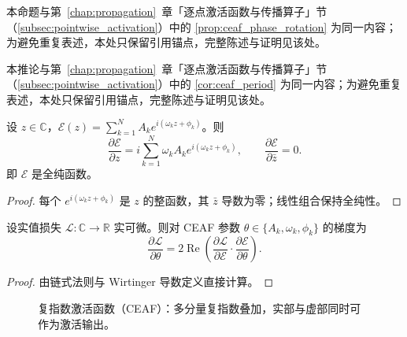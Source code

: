 \begin{proposition}\label{prop:ceaf_propagation_anchor}
本命题与第~\ref{chap:propagation}~章「逐点激活函数与传播算子」节（\cref{subsec:pointwise_activation}）中的 \cref{prop:ceaf_phase_rotation} 为同一内容；为避免重复表述，本处只保留引用锚点，完整陈述与证明见该处。
\end{proposition}

\begin{corollary}\label{cor:ceaf_period_ps}
本推论与第~\ref{chap:propagation}~章「逐点激活函数与传播算子」节（\cref{subsec:pointwise_activation}）中的 \cref{cor:ceaf_period} 为同一内容；为避免重复表述，本处只保留引用锚点，完整陈述与证明见该处。
\end{corollary}

\begin{proposition}\label{prop:ceaf_wirtinger}
设 $z\in\mathbb{C}$，$\mathcal{E}(z) = \sum_{k=1}^{N}A_k e^{i(\omega_k z+\phi_k)}$。则
\[
\frac{\partial\mathcal{E}}{\partial z} = i\sum_{k=1}^{N}\omega_k A_k e^{i(\omega_k z+\phi_k)}, \qquad
\frac{\partial\mathcal{E}}{\partial\bar z} = 0.
\]
即 $\mathcal{E}$ 是全纯函数。
\end{proposition}

\begin{proof}
每个 $e^{i(\omega_k z+\phi_k)}$ 是 $z$ 的整函数，其 $\bar z$ 导数为零；线性组合保持全纯性。
\end{proof}

\begin{corollary}\label{cor:ceaf_gradient}
设实值损失 $\mathcal{L}:\mathbb{C}\to\mathbb{R}$ 实可微。则对 CEAF 参数 $\theta\in\{A_k,\omega_k,\phi_k\}$ 的梯度为
\[
\frac{\partial\mathcal{L}}{\partial\theta} = 2\operatorname{Re}\left(\frac{\partial\mathcal{L}}{\partial\mathcal{E}}\cdot\frac{\partial\mathcal{E}}{\partial\theta}\right).
\]
\end{corollary}

\begin{proof}
由链式法则与 Wirtinger 导数定义直接计算。
\end{proof}

\begin{figure}[htbp]
\centering
{}
\caption{复指数激活函数（CEAF）：多分量复指数叠加，实部与虚部同时可作为激活输出。}
\label{fig:ps_ceaf}
\end{figure}

